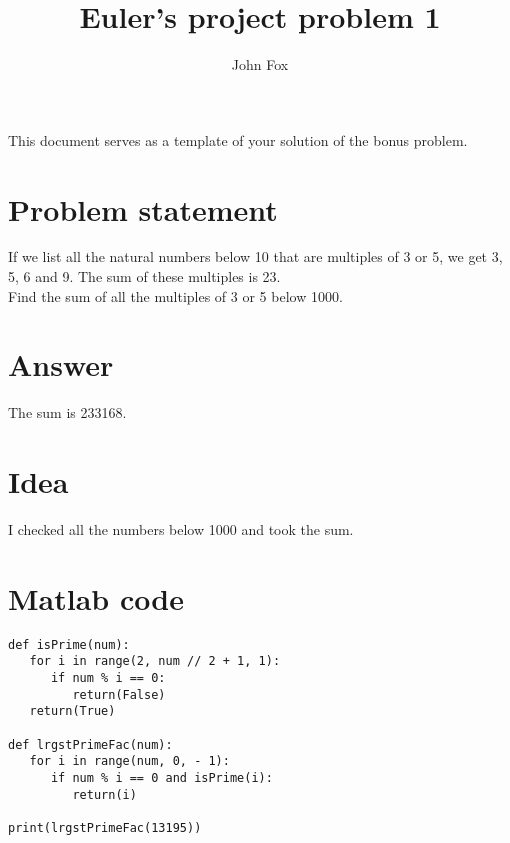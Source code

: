 \documentclass{article}
\title{Euler's project problem 1}
\author{John Fox}
\begin{document}
\maketitle
\large
This document serves as a template of your solution of the bonus problem.\\

\section*{Problem statement} 
If we list all the natural numbers below 10 that are multiples of 3 or 5, we get 3, 5, 6 and 9. The sum of these multiples is 23.\\

Find the sum of all the multiples of 3 or 5 below 1000.

\section*{Answer}
The sum is 233168.
\section*{Idea} I checked all the numbers below 1000 and took the sum.

\section*{Matlab code}
\begin{verbatim}
def isPrime(num):
   for i in range(2, num // 2 + 1, 1):
      if num % i == 0:
         return(False)
   return(True)

def lrgstPrimeFac(num):
   for i in range(num, 0, - 1):
      if num % i == 0 and isPrime(i):
         return(i)

print(lrgstPrimeFac(13195))
     
\end{verbatim}
\end{document}
